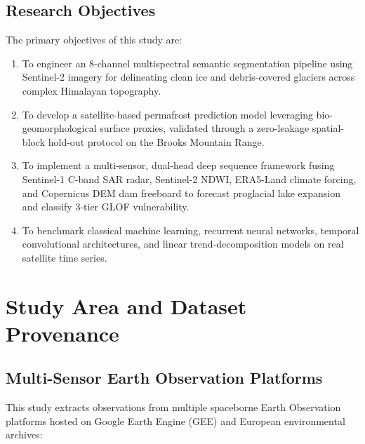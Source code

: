 \documentclass[12pt,a4paper]{report}
\begin{document}
\section{Research Objectives}
The primary objectives of this study are:
\begin{enumerate}
    \item To engineer an 8-channel multispectral semantic segmentation pipeline using Sentinel-2 imagery for delineating clean ice and debris-covered glaciers across complex Himalayan topography.
    \item To develop a satellite-based permafrost prediction model leveraging bio-geomorphological surface proxies, validated through a zero-leakage spatial-block hold-out protocol on the Brooks Mountain Range.
    \item To implement a multi-sensor, dual-head deep sequence framework fusing Sentinel-1 C-band SAR radar, Sentinel-2 NDWI, ERA5-Land climate forcing, and Copernicus DEM dam freeboard to forecast proglacial lake expansion and classify 3-tier GLOF vulnerability.
    \item To benchmark classical machine learning, recurrent neural networks, temporal convolutional architectures, and linear trend-decomposition models on real satellite time series.
\end{enumerate}


\chapter{Study Area and Dataset Provenance}

\section{Multi-Sensor Earth Observation Platforms}
This study extracts observations from multiple spaceborne Earth Observation platforms hosted on Google Earth Engine (GEE) and European environmental archives:
\end{document}
